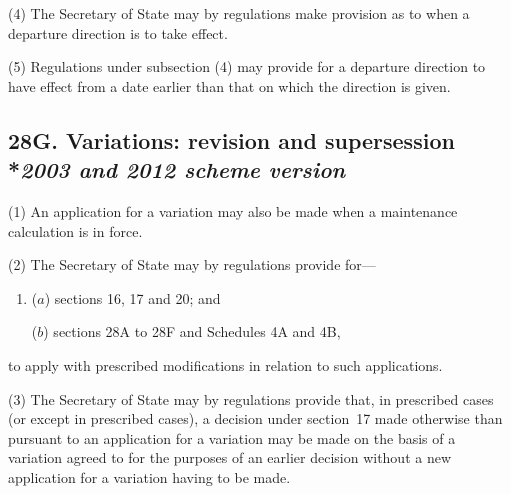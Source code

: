 \documentclass[12pt,a4paper]{article}
\begin{document}
(4) The Secretary of State may by regulations make provision as to when a departure direction is to take effect.

(5) Regulations under subsection (4) may provide for a departure direction to have effect from a date earlier than that on which the direction is given.


\subsection[28G. Variations: revision and supersession --- \emph{2003 and 2012 scheme version}]{28G. Variations: revision and supersession\\*\emph{2003 and 2012 scheme version}}

(1) An application for a variation may also be made when a maintenance calculation is in force.

(2) The Secretary of State may by regulations provide for—
\begin{enumerate}\item[]
($a$) sections 16, 17 and 20; and

($b$) sections 28A to 28F and Schedules 4A and 4B,
\end{enumerate}
to apply with prescribed modifications in relation to such applications.

(3) The Secretary of State may by regulations provide that, in prescribed cases (or except in prescribed cases), a decision under section~17 made otherwise than pursuant to an application for a variation may be made on the basis of a variation agreed to for the purposes of an earlier decision without a new application for a variation having to be made.

\end{document}

